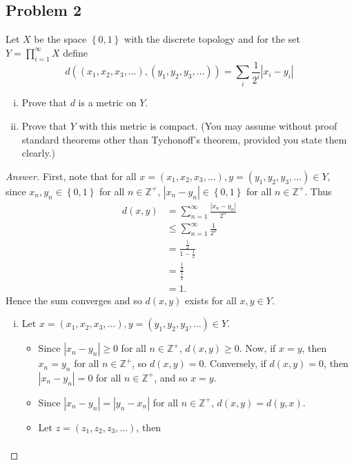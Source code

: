 \documentclass[12pt]{article}
\newcommand{\z}{\mathbb{Z}}
\newcommand\paren[1]{\left( #1 \right)}
\newcommand\setb[1]{\left \{ #1 \right \}}
\newcommand{\abs}[1]{\left| #1 \right|}
\theoremstyle{definition}
\begin{document}
\subsection{Problem 2}
Let $X$ be the space $\setb{0,1}$ with the discrete topology and for the set $Y = \prod_{i=1}^{\infty} X$ define
\[
    d \paren{ \paren{ x_1 , x_2 , x_3 , \dotsc } , \paren{ y_1 , y_2 , y_3 , \dotsc } } = \sum\limits_i \frac{1}{2^i} \abs{ x_i - y_i }
\]
\begin{enumerate}[(i)]
    \item Prove that $d$ is a metric on $Y$.
    \item Prove that $Y$ with this metric is compact. (You may assume without proof standard theorems other than Tychonoff's theorem, provided you state them clearly.)
\end{enumerate}
\begin{proof}[Answer]
    First, note that for all $x = \paren{ x_1 , x_2 , x_3 , \dotsc } , y = \paren{ y_1 , y_2 , y_3 , \dotsc } \in Y$, since $x_n , y_n \in \setb{ 0 , 1 }$ for all $n \in \z^+$, $\abs{ x_n - y_n } \in \setb{ 0 , 1 }$ for all $n \in \z^+$. Thus
    \begin{align*}
        d(x,y) & = \sum\limits_{n = 1}^{\infty} \frac{\abs{ x_n - y_n }}{2^n}  \\
        & \leq \sum\limits_{n = 1}^{\infty} \frac{1}{2^n} \\ 
        & = \frac{\frac{1}{2}}{1 - \frac{1}{2}} \\
        & = \frac{\frac{1}{2}}{\frac{1}{2}} \\
        & = 1.
    \end{align*}
    Hence the sum converges and so $d(x,y)$ exists for all $x , y \in Y$.
    \begin{enumerate}[(i)]
        \item Let $x = \paren{ x_1 , x_2 , x_3 , \dotsc } , y = \paren{ y_1 , y_2 , y_3 , \dotsc } \in Y$.
        \begin{itemize}
            \item Since $\abs{ x_n - y_n } \geq 0$ for all $n \in \z^+$, $d(x,y) \geq 0$. Now, if $x = y$, then $x_n = y_n$ for all $n \in \z^+$, so $d(x,y) = 0$. Conversely, if $d(x,y) = 0$, then $\abs{ x_n - y_n } = 0$ for all $n \in \z^+$, and so $x = y$.
            \item Since $\abs{ x_n - y_n } = \abs{ y_n - x_n }$ for all $n \in \z^+$, $d(x,y) = d(y,x)$.
            \item Let $z = \paren{ z_1 , z_2 , z_3 , \dotsc }$, then 
            \begin{align*}

\end{align*}
\end{itemize}
\end{enumerate}
\end{proof}
\end{document}
